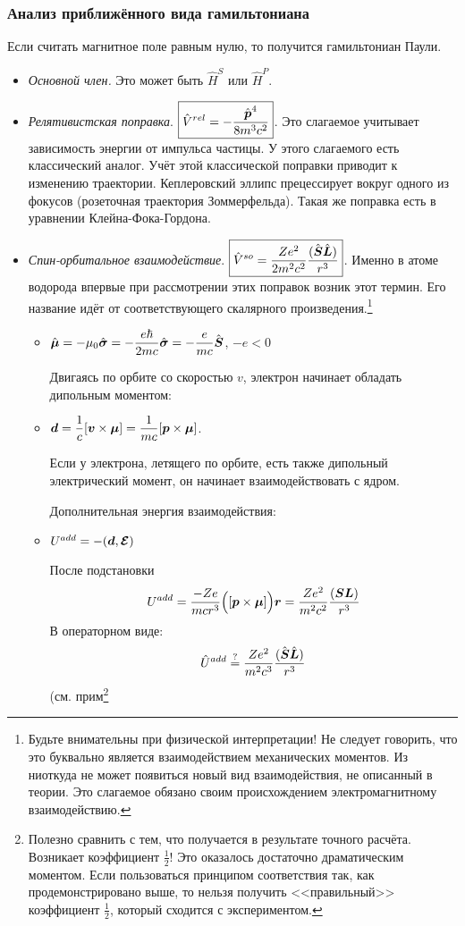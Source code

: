 \subsubsection{Анализ приближённого вида гамильтониана}
Если считать магнитное поле равным нулю, то получится гамильтониан Паули.
\begin{itemize}
  \item \emph{Основной член.} Это может быть $\hat H^{S}$ или $\hat H^{P}$.
  \item \emph{Релятивистская поправка}. $\boxed{\hat V^{rel} = - \dfrac{\hat{\bf p}^4}{8m^3c^2}}$. Это слагаемое учитывает зависимость энергии от импульса частицы. У этого слагаемого есть классический аналог. Учёт этой классической поправки приводит к изменению траектории. Кеплеровский эллипс прецессирует вокруг одного из фокусов (розеточная траектория Зоммерфельда). Такая же поправка есть в уравнении Клейна-Фока-Гордона.
  \item \emph{Спин-орбитальное взаимодействие}. $\boxed{\hat V^{so} = \dfrac{Ze^2}{2m^2c^2} \dfrac{(\hat{\bf S} \hat{\bf L})}{r^3}}$. Именно в атоме водорода впервые при рассмотрении этих поправок возник этот термин. Его название идёт от соответствующего скалярного произведения.\footnote{Будьте внимательны при физической интерпретации! Не следует говорить, что это буквально является взаимодействием механических моментов. Из ниоткуда не может появиться новый вид взаимодействия, не описанный в теории. Это слагаемое обязано своим происхождением электромагнитному взаимодействию.}
      \begin{itemize}
        \item $\hat{\bf \mu} = - \mu_0 \hat{\bf \sigma} = - \dfrac{e\hbar}{2mc} \hat{\bf \sigma} = -\dfrac{e}{mc} \hat{\bf S}$, $-e < 0$
            
            Двигаясь по орбите со скоростью $v$, электрон начинает обладать дипольным моментом:
        \item $\bf d = \dfrac{1}{c}[\bf v \times \bf \mu] = \dfrac{1}{mc} [\bf p \times \bf \mu]$.
        
        Если у электрона, летящего по орбите, есть также дипольный электрический момент, он начинает взаимодействовать с ядром.
        
        Дополнительная энергия взаимодействия:
        \item $U^{add} = - (\bf d, \bf{\mathcal E})$
        
        После подстановки
        $$
            U^{add} = \dfrac{-Ze}{mc r^3} \Big(
                [\bf p \times \bf \mu]
            \Big) \bf r = \dfrac{Ze^2}{m^2c^2} \dfrac{(\bf S \bf L)}{r^3}
        $$
        В операторном виде:
        $$
            \hat U^{add} \overset{?}= \dfrac{Ze^2}{m^2c^3} \dfrac{(\hat {\bf S} \hat {\bf L})}{r^3}
        $$
        (см. прим\footnote{
        Полезно сравнить с тем, что получается в результате точного расчёта. Возникает коэффициент $\frac{1}{2}$! Это оказалось достаточно драматическим моментом. Если пользоваться принципом соответствия так, как продемонстрировано выше, то нельзя получить <<правильный>> коэффициент $\frac{1}{2}$, который сходится с экспериментом.
        
}
\end{itemize}
\end{itemize}
